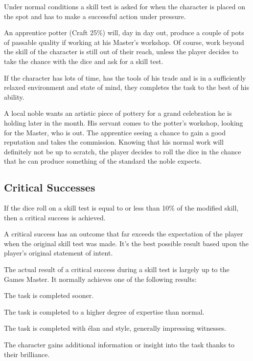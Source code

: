 Under normal conditions a skill test is asked for when the character is placed on the spot and has to make a successful action under pressure. 

\begin{rpg-examplebox}
An apprentice potter (Craft 25\%) will, day in day out, produce a couple of pots of passable quality if working at his Master’s workshop. Of course, work beyond the skill of the character is still out of their reach, unless the player decides to take the chance with the dice and ask for a skill test.
\end{rpg-examplebox}

If the character has lots of time, has the tools of his trade and is in a sufficiently relaxed environment and state of mind, they completes the task to the best of his ability. 

\begin{rpg-examplebox}
A local noble wants an artistic piece of pottery for a grand celebration he is holding later in the month. His servant comes to the potter’s workshop, looking for the Master, who is out. The apprentice seeing a chance to gain a good reputation and takes the commission. Knowing that his normal work will definitely not be up to scratch, the player decides to roll the dice in the chance that he can produce something of the standard the noble expects.
\end{rpg-examplebox}

\subsection{Critical Successes}
If the dice roll on a skill test is equal to or less than 10\% of the modified skill, then a critical success is achieved. 

A critical success has an outcome that far exceeds the expectation of the player when the original skill test was made. It’s the best possible result based upon the player’s original statement of intent.

The actual result of a critical success during a skill test is largely up to the Games Master. It normally achieves one of the following results: 

\begin{rpg-list}
\item The task is completed sooner. 
\item The task is completed to a higher degree of expertise than normal. 
\item The task is completed with élan and style, generally impressing witnesses. 
\item The character gains additional information or insight into the task thanks to their brilliance. 
\end{rpg-list}

